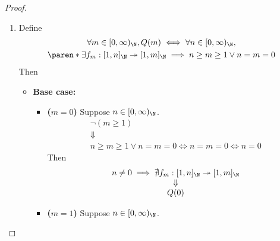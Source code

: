 \begin{proof}
\begin{enumerate}[label=\textbf{(\Alph*)}]
\begin{itemize}
\[\begin{array}{c}
                      \Downarrow                                         \\
                      n + 1 \leq m                                       \\
                    \end{array}
                  \]
                  Therefore, $P(n + 1)$.
          \end{itemize}
          By \cref{an1:thm:mathematical-induction},
          \[
            \forall n \in [0, \infty)_{\N}, P(n)
          \]
    \item Define
          \[
            \begin{gathered}
              \forall m \in [0, \infty)_{\N}, Q(m) \iff \forall n \in [0, \infty)_{\N}, \\ \paren*{\exists
                f_{m}: [1, n]_{\N} \twoheadrightarrow [1, m]_{\N}} \implies n \geq m \geq 1 \lor n = m = 0
            \end{gathered}
          \]
          Then
          \begin{itemize}
            \item \textbf{Base case:}
                  \begin{itemize}
                    \item \textbf{($m = 0$)} Suppose $n \in [0, \infty)_{\N}$.
                          \[
                            \begin{array}{c}
                              \neg(m \geq 1) \\
                              \Downarrow     \\
                              n \geq m \geq 1 \lor n = m = 0 \iff n = m = 0 \iff n = 0
                            \end{array}
                          \]
                          Then
                          \[
                            \begin{array}{c}
                              n \neq 0 \implies \nexists f_{m}: [1, n]_{\N} \twoheadrightarrow [1, m]_{\N} \\
                              \Downarrow                                                                   \\
                              Q(0)
                            \end{array}
                          \]
                    \item \textbf{($m = 1$)} Suppose $n \in [0, \infty)_{\N}$.
                          \[
\]
\end{itemize}
\end{itemize}
\end{enumerate}
\end{proof}
